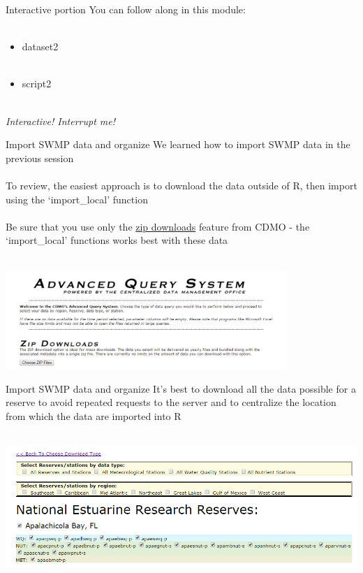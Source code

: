 \documentclass[xcolor=svgnames]{beamer}\usepackage[]{graphicx}\usepackage[]{color}
\begin{document}
\begin{frame}{Interactive portion}
You can follow along in this module: \\~\\
\begin{itemize}
\item dataset2 \\~\\
\item script2 \\~\\
\end{itemize}
\Large
\centerline{\emph{Interactive! Interrupt me!}}
\end{frame}

\begin{frame}{Import SWMP data and organize}
We learned how to import SWMP data in the previous session \\~\\
To review, the easiest approach is to download the data outside of R, then import using the `import_local' function \\~\\
Be sure that you use only the \href{http://cdmo.baruch.sc.edu/aqs/zips.cfm}{zip downloads} feature from CDMO - the `import_local' functions works best with these data \\~\\
\centerline{\includegraphics[width = 0.8\textwidth]{adv_query.png}}
\end{frame}

\begin{frame}[t]{Import SWMP data and organize}
It's best to download all the data possible for a reserve to avoid repeated requests to the server and to centralize the location from which the data are imported into R \\~\\
\centerline{\includegraphics[width = \textwidth]{zip_eda.png}}
\end{frame}
\end{document}
